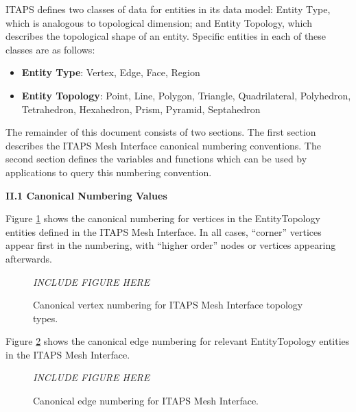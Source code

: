 \documentclass{article}
\begin{document}
ITAPS defines two classes of data for entities in its data model: 
Entity Type, which is analogous to topological dimension; and 
Entity Topology, which describes the topological shape of an 
entity. Specific entities in each of these classes are as follows:

\begin{itemize}
\item \textbf{Entity Type}: Vertex, Edge, Face, Region
\item \textbf{Entity Topology}: Point, Line, Polygon, Triangle, Quadrilateral, 
Polyhedron, Tetrahedron, Hexahedron, Prism, Pyramid, Septahedron
\end{itemize}

The remainder of this document consists of two sections. The 
first section describes the ITAPS Mesh Interface canonical numbering 
conventions. The second section defines the variables and functions 
which can be used by applications to query this numbering convention.\\

\begin{large}
\textbf{II.1 Canonical Numbering Values\\}    %
\end{large}

Figure \ref{app-fig1} shows the canonical 
numbering for vertices in the EntityTopology entities defined 
in the ITAPS Mesh Interface. In all cases, ``corner'' vertices 
appear first in the numbering, with ``higher order'' nodes or 
vertices appearing afterwards.

\begin{figure}[htbp]
\begin{center}
\emph{INCLUDE FIGURE HERE}
\caption{Canonical vertex numbering for ITAPS Mesh Interface 
topology types.}
\label{app-fig1}
\end{center}
\end{figure}


Figure \ref{app-fig2} shows the canonical 
edge numbering for relevant EntityTopology entities in the ITAPS 
Mesh Interface.

\begin{figure}[htbp]
\begin{center}
\emph{INCLUDE FIGURE HERE}
\caption{Canonical edge numbering for ITAPS Mesh Interface.}
\label{app-fig2}
\end{center}
\end{figure}
\end{document}
